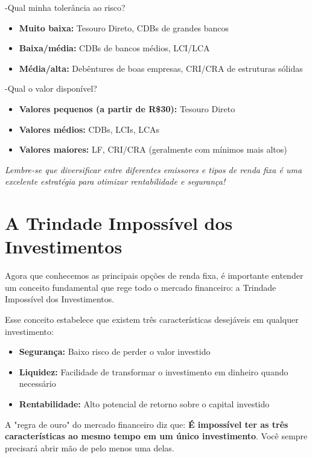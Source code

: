 -Qual minha tolerância ao risco?
\begin{itemize}
    \item \textbf{Muito baixa:} Tesouro Direto, CDBs de grandes bancos
    \item \textbf{Baixa/média:} CDBs de bancos médios, LCI/LCA
    \item \textbf{Média/alta:} Debêntures de boas empresas, CRI/CRA de estruturas sólidas
\end{itemize}

-Qual o valor disponível?
\begin{itemize}
    \item \textbf{Valores pequenos (a partir de R\$30):} Tesouro Direto
    \item \textbf{Valores médios:} CDBs, LCIs, LCAs
    \item \textbf{Valores maiores:} LF, CRI/CRA (geralmente com mínimos mais altos)
\end{itemize}

\vspace{0.5cm}
\noindent
\textit{Lembre-se que diversificar entre diferentes emissores e tipos de renda fixa é uma excelente estratégia para otimizar rentabilidade e segurança!}
\section{A Trindade Impossível dos Investimentos}

\noindent Agora que conhecemos as principais opções de renda fixa, é importante entender um conceito fundamental que rege todo o mercado financeiro: a Trindade Impossível dos Investimentos.

\vspace{0.5cm}
\noindent Esse conceito estabelece que existem três características desejáveis em qualquer investimento:

\begin{itemize}[leftmargin=*]
    \item \textbf{Segurança:} Baixo risco de perder o valor investido
    \item \textbf{Liquidez:} Facilidade de transformar o investimento em dinheiro quando necessário
    \item \textbf{Rentabilidade:} Alto potencial de retorno sobre o capital investido
\end{itemize}

\vspace{0.5cm}
\noindent A "regra de ouro" do mercado financeiro diz que: \textbf{É impossível ter as três características ao mesmo tempo em um único investimento}. Você sempre precisará abrir mão de pelo menos uma delas.

